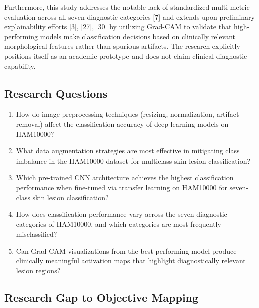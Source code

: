 \documentclass[11pt,a4paper]{article}
\begin{document}
Furthermore, this study addresses the notable lack of standardized multi-metric evaluation across all seven diagnostic categories [7] and extends upon preliminary explainability efforts [3], [27], [30] by utilizing Grad-CAM to validate that high-performing models make classification decisions based on clinically relevant morphological features rather than spurious artifacts. The research explicitly positions itself as an academic prototype and does not claim clinical diagnostic capability.

\subsection*{Research Questions}

\begin{enumerate}[label=\textbf{RQ\arabic*:}, leftmargin=*, itemsep=6pt]
\item How do image preprocessing techniques (resizing, normalization, artifact removal) affect the classification accuracy of deep learning models on HAM10000?
\item What data augmentation strategies are most effective in mitigating class imbalance in the HAM10000 dataset for multiclass skin lesion classification?
\item Which pre-trained CNN architecture achieves the highest classification performance when fine-tuned via transfer learning on HAM10000 for seven-class skin lesion classification?
\item How does classification performance vary across the seven diagnostic categories of HAM10000, and which categories are most frequently misclassified?
\item Can Grad-CAM visualizations from the best-performing model produce clinically meaningful activation maps that highlight diagnostically relevant lesion regions?
\end{enumerate}

\subsection*{Research Gap to Objective Mapping}
\end{document}

